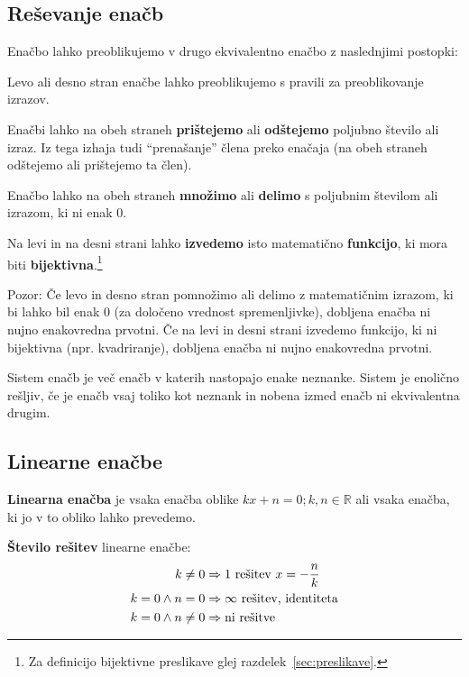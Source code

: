 \documentclass[a4paper,oneside,12pt,fleqn]{article}
\def\R{\ensuremath{\mathbb R}}
\renewcommand\implies\Rightarrow
\numberwithin{equation}{section}
\newenvironment{itemize*}%
{
\vspace{-12pt}%
\begin{itemize}%
\setlength{\itemsep}{0pt}%
\setlength{\parskip}{2pt}}%
{\end{itemize}}
\begin{document}
\subsection{Reševanje enačb}
\label{sec:enac:resev}
Enačbo lahko preoblikujemo v drugo ekvivalentno enačbo z naslednjimi postopki:
\begin{itemize*}
  \item Levo ali desno stran enačbe lahko preoblikujemo s pravili za preoblikovanje
    izrazov.
  \item Enačbi lahko na obeh straneh \textbf{prištejemo} ali \textbf{odštejemo} poljubno število
ali izraz. Iz tega izhaja tudi ``prenašanje'' člena preko enačaja (na obeh straneh odštejemo ali
prištejemo ta člen).

  \item Enačbo lahko na obeh straneh \textbf{množimo} ali \textbf{delimo} s poljubnim številom ali izrazom, ki ni
enak 0.

  \item Na levi in na desni strani lahko \textbf{izvedemo} isto matematično \textbf{funkcijo}, ki mora biti
\textbf{bijektivna}.\footnote{Za definicijo bijektivne preslikave glej
razdelek~\ref{sec:preslikave}.}
\end{itemize*}

Pozor: Če levo in desno stran pomnožimo ali delimo z matematičnim izrazom, ki bi lahko bil
enak 0 (za določeno vrednost spremenljivke), dobljena enačba ni nujno enakovredna prvotni.
Če na levi in desni strani izvedemo funkcijo, ki ni bijektivna (npr. kvadriranje),
dobljena enačba ni nujno enakovredna prvotni.

Sistem enačb je več enačb v katerih nastopajo enake neznanke. Sistem je enolično rešljiv,
če je enačb vsaj toliko kot neznank in nobena izmed enačb ni ekvivalentna drugim.

\subsection{Linearne enačbe}
\label{sec:enac:lin}
\textbf{Linearna enačba} je vsaka enačba oblike $kx + n = 0; k, n \in \R$ ali vsaka enačba, ki jo v to
obliko lahko prevedemo.

\textbf{Število rešitev} linearne enačbe:
\begin{align*}
  k \neq 0 &\implies \textnormal{1 rešitev } x = -\frac{n}{k} \\
  k = 0 \land n = 0 &\implies \infty \textnormal{ rešitev, identiteta} \\
  k = 0 \land n \neq 0 &\implies \textnormal{ni rešitve}
\end{align*}
\end{document}
